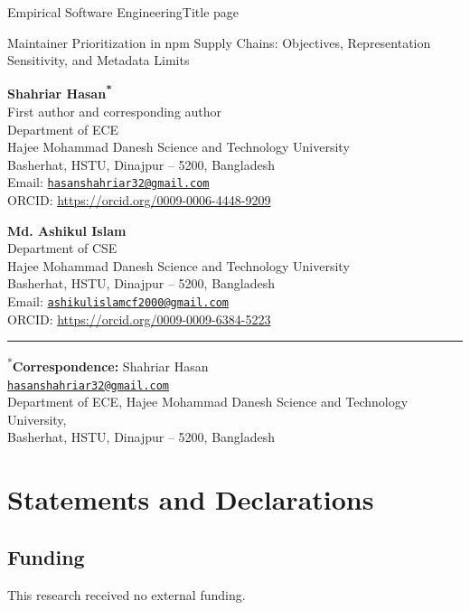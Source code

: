 \documentclass[11pt,a4paper]{article}
\begin{document}
{\small Empirical Software Engineering\hfill Title page}
\vspace{12mm}

{\LARGE\bfseries\raggedright Maintainer Prioritization in npm Supply Chains: Objectives, Representation Sensitivity, and Metadata Limits\par}
\vspace{12mm}

{\large\bfseries Shahriar Hasan\textsuperscript{*}}\\[3pt]
First author and corresponding author\\
Department of ECE\\
Hajee Mohammad Danesh Science and Technology University\\
Basherhat, HSTU, Dinajpur -- 5200, Bangladesh\\
Email: \href{mailto:hasanshahriar32@gmail.com}{\nolinkurl{hasanshahriar32@gmail.com}}\\
ORCID: \url{https://orcid.org/0009-0006-4448-9209}

\vspace{9mm}
{\large\bfseries Md. Ashikul Islam}\\[3pt]
Department of CSE\\
Hajee Mohammad Danesh Science and Technology University\\
Basherhat, HSTU, Dinajpur -- 5200, Bangladesh\\
Email: \href{mailto:ashikulislamcf2000@gmail.com}{\nolinkurl{ashikulislamcf2000@gmail.com}}\\
ORCID: \url{https://orcid.org/0009-0009-6384-5223}

\vspace{12mm}
\hrule
\vspace{3mm}
\textsuperscript{*}\textbf{Correspondence:} Shahriar Hasan\\
\href{mailto:hasanshahriar32@gmail.com}{\nolinkurl{hasanshahriar32@gmail.com}}\\
Department of ECE, Hajee Mohammad Danesh Science and Technology University,\\
Basherhat, HSTU, Dinajpur -- 5200, Bangladesh
\newpage\small
\section*{Statements and Declarations}

\subsection*{Funding}
This research received no external funding.
\end{document}
